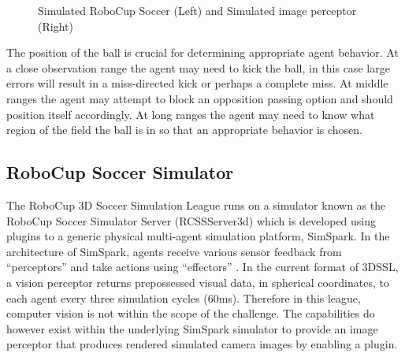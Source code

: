 \documentclass[a4paper,twoside,12pt]{report}
\begin{document}
\begin{figure}[h!]
    \centering
    \qquad
    \caption{Simulated RoboCup Soccer (Left) and Simulated image perceptor (Right)}
\end{figure}

The position of the ball is crucial for determining appropriate agent behavior. At a close observation range the agent may need to kick the ball, in this case large errors will result in a miss-directed kick or perhaps a complete miss. At middle ranges the agent may attempt to block an opposition passing option and should position itself accordingly. At long ranges the agent may need to know what region of the field the ball is in so that an appropriate behavior is chosen. 

\subsection{RoboCup Soccer Simulator}

The RoboCup 3D Soccer Simulation League runs on a simulator known as the RoboCup Soccer Simulator Server (RCSSServer3d) which is developed using plugins to a generic physical multi-agent simulation platform, SimSpark. In the architecture of SimSpark, agents receive various sensor feedback from ``perceptors'' and take actions using ``effectors'' \citep{simspark}. In the current format of 3DSSL, a vision perceptor returns prepossessed visual data, in spherical coordinates, to each agent every three simulation cycles (60ms). Therefore in this league, computer vision is not within the scope of the challenge. The capabilities do however exist within the underlying SimSpark simulator to provide an image perceptor that produces rendered simulated camera images by enabling a plugin.
\end{document}
